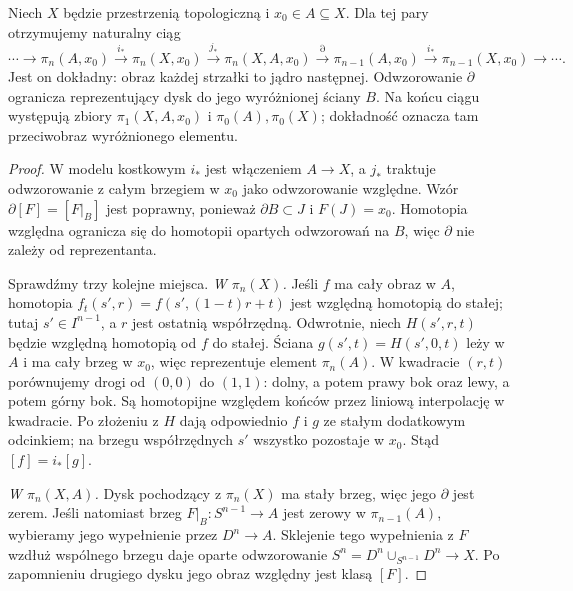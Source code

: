 \begin{twierdzenie}
\label{thm:les-pi}
Niech $X$ będzie przestrzenią topologiczną
i $x_0\in A\subseteq X$.
Dla tej pary otrzymujemy
naturalny ciąg
\begin{equation}\label{eq:les-pi}
 \cdots\to\pi_n(A,x_0)\xrightarrow{i_*}
 \pi_n(X,x_0)\xrightarrow{j_*}
 \pi_n(X,A,x_0)\xrightarrow{\partial}
 \pi_{n-1}(A,x_0)\xrightarrow{i_*}
 \pi_{n-1}(X,x_0)\to\cdots .
\end{equation}
Jest on dokładny: obraz każdej
strzałki to jądro następnej.
Odwzorowanie $\partial$ ogranicza
reprezentujący dysk do jego
wyróżnionej ściany $B$.
Na końcu ciągu występują
zbiory $\pi_1(X,A,x_0)$ i
$\pi_0(A),\pi_0(X)$; dokładność
oznacza tam przeciwobraz
wyróżnionego elementu.
\end{twierdzenie}
\begin{proof}
W modelu kostkowym $i_*$ jest
włączeniem $A\to X$, a $j_*$
traktuje odwzorowanie z całym brzegiem
w $x_0$ jako odwzorowanie względne.
Wzór $\partial[F]=[F|_B]$
jest poprawny, ponieważ
$\partial B\subset J$ i
$F(J)=x_0$. Homotopia
względna ogranicza się
do homotopii opartych
odwzorowań na $B$, więc
$\partial$ nie zależy
od reprezentanta.

Sprawdźmy trzy kolejne miejsca.
\emph{W $\pi_n(X)$.} Jeśli $f$ ma cały obraz w $A$, homotopia
$f_t(s',r)=f(s',(1-t)r+t)$ jest względną homotopią do stałej;
tutaj $s'\in I^{n-1}$, a $r$ jest ostatnią współrzędną.
Odwrotnie, niech $H(s',r,t)$ będzie względną homotopią
od $f$ do stałej. Ściana $g(s',t)=H(s',0,t)$ leży w $A$
i ma cały brzeg w $x_0$, więc reprezentuje element $\pi_n(A)$.
W kwadracie $(r,t)$ porównujemy drogi od $(0,0)$ do $(1,1)$:
dolny, a potem prawy bok oraz lewy, a potem górny bok.
Są homotopijne względem końców przez liniową interpolację w kwadracie.
Po złożeniu z $H$ dają odpowiednio $f$ i $g$ ze stałym dodatkowym
odcinkiem; na brzegu współrzędnych $s'$ wszystko pozostaje w $x_0$.
Stąd $[f]=i_*[g]$.

\emph{W $\pi_n(X,A)$.} Dysk
pochodzący z $\pi_n(X)$
ma stały brzeg, więc jego
$\partial$ jest zerem.
Jeśli natomiast brzeg
$F|_B:S^{n-1}\to A$ jest
zerowy w $\pi_{n-1}(A)$,
wybieramy jego wypełnienie
przez $D^n\to A$. Sklejenie
tego wypełnienia z $F$
wzdłuż wspólnego brzegu
daje oparte odwzorowanie
$S^n=D^n\cup_{S^{n-1}}D^n\to X$.
Po zapomnieniu drugiego
dysku jego obraz względny
jest klasą $[F]$.


\end{proof}
